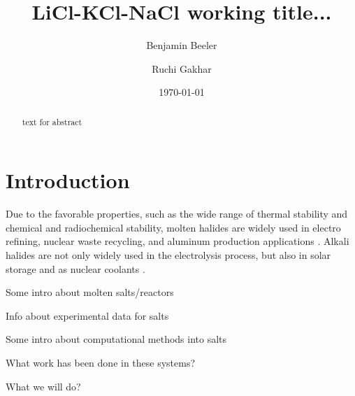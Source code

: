 \documentclass[review]{elsarticle}
\begin{document}
\begin{frontmatter}

\title{LiCl-KCl-NaCl working title... }

\author[ncsu,inl]{Benjamin Beeler}
\author[inl]{Ruchi Gakhar}

\address[ncsu]{North Carolina State University, Raleigh, NC 27695}
\address[inl]{Idaho National Laboratory, Idaho Falls, ID 83415}
\date{\today}

\begin{abstract}
text for abstract

\end{abstract}

\end{frontmatter}

\section{Introduction}

Due to the favorable properties, such as the wide range of thermal stability and chemical and radiochemical stability, molten halides are widely used in electro refining, nuclear waste recycling, and aluminum production applications \cite{rollet2011}. Alkali halides are not only widely used in the electrolysis process, but also in solar storage \cite{Ding2017} and as nuclear coolants \cite{Li2017}. 


Some intro about molten salts/reactors

Info about experimental data for salts

Some intro about computational methods into salts

What work has been done in these systems?

What we will do?
\end{document}
